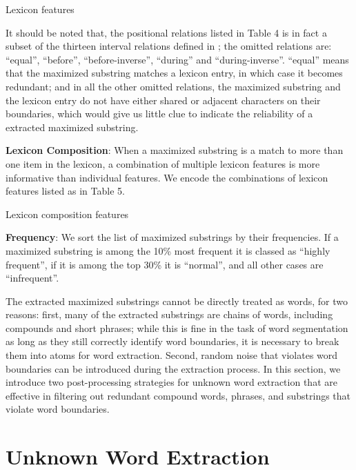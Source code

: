\documentclass[english]{jnlp_1.4}
\begin{document}
\begin{table}[b]
\caption{Lexicon features}

\end{table}

It should be noted that, the positional relations listed in Table 4 is in fact a subset of the thirteen interval relations defined in \cite{allen1983maintaining}; the omitted relations are: ``equal'', ``before'', ``before-inverse'', ``during'' and ``during-inverse''. ``equal'' means that the maximized substring matches a lexicon entry, in which case it becomes redundant; and in all the other omitted relations, the maximized substring and the lexicon entry do not have either shared or adjacent characters on their boundaries, which would give us little clue to indicate the reliability of a extracted  maximized substring.

{\bf Lexicon Composition}: When a maximized substring is a match to more than one item in the lexicon, a combination of multiple lexicon features is more informative than individual features. We encode the combinations of lexicon features listed as in Table 5.

\begin{table}[t]
\caption{Lexicon composition features}

\end{table}

{\bf Frequency}: We sort the list of maximized substrings by their frequencies. If a maximized substring is among the 10\% most frequent it is classed as ``highly frequent'', if it is among the top 30\% it is ``normal'', and all other cases are ``infrequent''.

The extracted maximized substrings cannot be directly treated as words, for two reasons: first, many of the extracted substrings are chains of words, including compounds and short phrases; while this is fine in the task of word segmentation as long as they still correctly identify word boundaries, it is necessary to break them into atoms for word extraction. Second, random noise that violates word boundaries can be introduced during the extraction process. In this section, we introduce two post-processing strategies for unknown word extraction that are effective in filtering out redundant compound words, phrases, and substrings that violate word boundaries.


\section{Unknown Word Extraction}
\end{document}
